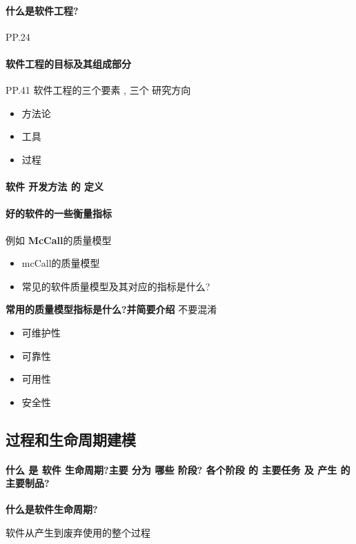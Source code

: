 \documentclass[UTF8,a4paper]{ctexart}
\begin{document}
\paragraph{什么是软件工程?}PP.24

\paragraph{软件工程的目标及其组成部分}PP.41
软件工程的三个要素 , 三个 研究方向
\begin{itemize}
  \item 方法论
  \item 工具
  \item 过程
\end{itemize}

\paragraph{软件 开发方法 的 定义}

\paragraph{好的软件的一些衡量指标} 例如 \textbf{McCall}的质量模型

\begin{itemize}
  \item mcCall的质量模型
  \item 常见的软件质量模型及其对应的指标是什么?
\end{itemize}

\textbf{常用的质量模型指标是什么?并简要介绍}
不要混淆
\begin{itemize}
  \item 可维护性
  \item 可靠性
  \item 可用性
  \item 安全性
\end{itemize}

\subsection{过程和生命周期建模}
\paragraph{什么 是 软件 生命周期?主要 分为 哪些 阶段? 各个阶段 的 主要任务 及 产生 的主要制品?}

\textbf{什么是软件生命周期?}

软件从产生到废弃使用的整个过程
\end{document}
